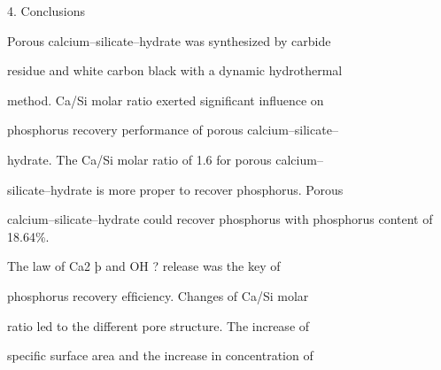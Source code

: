 \documentclass[a4paper,portrait,12pt]{article}
\begin{document}
\begin{flushleft}
4. Conclusions
\end{flushleft}


\begin{flushleft}
Porous calcium--silicate--hydrate was synthesized by carbide
\end{flushleft}


\begin{flushleft}
residue and white carbon black with a dynamic hydrothermal
\end{flushleft}


\begin{flushleft}
method. Ca/Si molar ratio exerted signiﬁcant inﬂuence on
\end{flushleft}





\begin{flushleft}
phosphorus recovery performance of porous calcium--silicate--
\end{flushleft}


\begin{flushleft}
hydrate. The Ca/Si molar ratio of 1.6 for porous calcium--
\end{flushleft}


\begin{flushleft}
silicate--hydrate is more proper to recover phosphorus. Porous
\end{flushleft}


\begin{flushleft}
calcium--silicate--hydrate could recover phosphorus with phosphorus content of 18.64\%.
\end{flushleft}


\begin{flushleft}
The law of Ca2 þ and OH ? release was the key of
\end{flushleft}


\begin{flushleft}
phosphorus recovery efﬁciency. Changes of Ca/Si molar
\end{flushleft}


\begin{flushleft}
ratio led to the different pore structure. The increase of
\end{flushleft}


\begin{flushleft}
speciﬁc surface area and the increase in concentration of
\end{flushleft}
\end{document}
